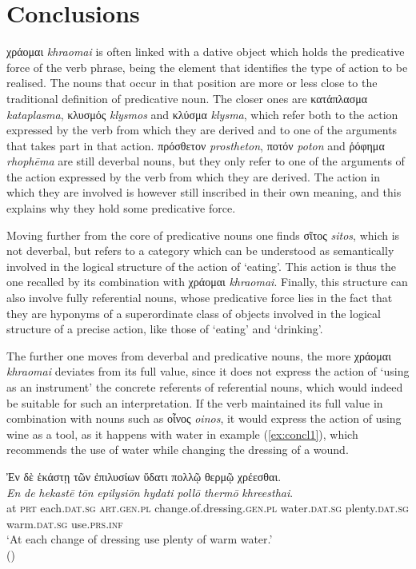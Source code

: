 \documentclass[output=paper,colorlinks,citecolor=brown]{langscibook}
\begin{document}
\section{Conclusions}
\largerpage
χράομαι \textit{khraomai} is often linked with a dative object which holds the predicative force of the verb phrase, being the element that identifies the type of action to be realised. The nouns that occur in that position are more or less close to the traditional definition of predicative noun. The closer ones are κατάπλασμα \textit{kataplasma}, κλυσμός \textit{klysmos} and κλύσμα \textit{klysma}, which refer both to the action expressed by the verb from which they are derived and to one of the arguments that takes part in that action. πρόσθετον \textit{prostheton}, ποτόν \textit{poton} and ῥόφημα \textit{rhophēma} are still deverbal nouns, but they only refer to one of the arguments of the action expressed by the verb from which they are derived. The action in which they are involved is however still inscribed in their own meaning, and this explains why they hold some predicative force. 

Moving further from the core of predicative nouns one finds σῖτος \textit{sitos}, which is not deverbal, but refers to a category which can be understood as semantically involved in the logical structure of the action of ‘eating’. This action is thus the one recalled by its combination with χράομαι \textit{khraomai}. Finally, this structure can also involve fully referential nouns, whose predicative force lies in the fact that they are hyponyms of a superordinate class of objects involved in the logical structure of a precise action, like those of `eating' and `drinking'.

The further one moves from deverbal and predicative nouns, the more χράομαι \textit{khraomai} deviates from its full value, since it does not express the action of `using as an instrument' the concrete referents of referential nouns, which would indeed be suitable for such an interpretation. If the verb maintained its full value in combination with nouns such as οἶνος \textit{oinos}, it would express the action of using wine as a tool, as it happens with water in example (\ref{ex:concl1}), which recommends the use of water while changing the dressing of a wound.

\begin{exe}
\ex\label{ex:concl1}
\glll Ἐν δὲ ἑκάστῃ τῶν ἐπιλυσίων ὕδατι πολλῷ θερμῷ χρέεσθαι.\\ 
\textit{En} \textit{de} \textit{hekastē} \textit{tōn} \textit{epilysiōn} \textit{hydati} \textit{pollō} \textit{thermō} \textit{khreesthai}.\\
at \textsc{prt} each.\textsc{dat.sg} \textsc{art.gen.pl} change.of.dressing.\textsc{gen.pl} water.\textsc{dat.sg} plenty.\textsc{dat.sg} warm.\textsc{dat.sg} use.\textsc{prs.inf} \\
\glt ‘At each change of dressing use plenty of warm water.' \\
\hspace*{\fill}()
\end{exe}
\end{document}
